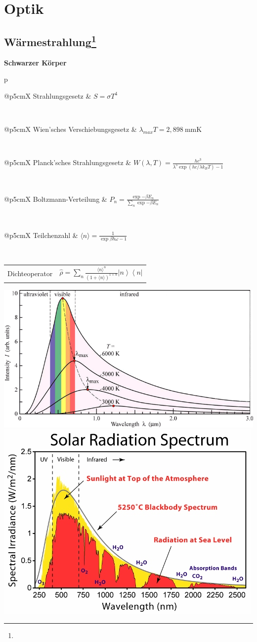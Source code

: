 \documentclass[12pt,a4paper, twoside]{article}
\makeatletter
\newcommand{\ket}[1]{\left| #1 \right>}
\newcommand{\bra}[1]{\left< #1 \right|}
\renewcommand{\=}[1]{\stackrel{#1}{=}}
\newcommand{\erw}[1]{\langle #1 \rangle}
\theoremstyle{definition}
\theoremstyle{remark}
\newcommand{\concept}[2]{%
\noindent
\begin{framed}
\noindent\textbf{#1}
\par\begin{tabular}{p{\linewidth}}
#2
\end{tabular}
\end{framed}
}
\newcommand{\f}[2]{%
\noindent\begin{tabularx}{\linewidth}{@{}p{5cm}X}
#1 & $#2$
\end{tabularx}}
\makeatother
\begin{document}
\newpage
\section{Optik}

\subsection[Wärmestrahlung]{Wärmestrahlung\let\thefootnote\relax\footnote{}}

\concept{Schwarzer Körper}{
\f{Strahlungsgesetz}{S = \sigma T^4}\\
\f{Wien'sches Verschiebungsgesetz}{\lambda_{max} T = 2,898~\text{mmK}}\\
\f{Planck'sches Strahlungsgesetz}{W(\lambda, T)  = \frac{hc^3}{\lambda^5 \exp{(hc/ \lambda k_B T)} - 1}}\\
\f{Boltzmann-Verteilung}{P_n = \frac{\exp{- \beta E_n}}{\sum_n \exp{-\beta E_n}}}\\
\f{Teilchenzahl}{\erw{n} = \frac{1}{\exp{\beta \hbar \omega} - 1}}\\
\f{Dichteoperator}{\hat \rho = \sum_n \frac{\erw{n}^n}{(1+\erw{n})^{1+n}} \ket n \bra n}
}

\includegraphics[width=\linewidth]{pic/planck.png}\\
\includegraphics[width=\linewidth]{pic/sonnenspektrum.jpg}\\
\end{document}
